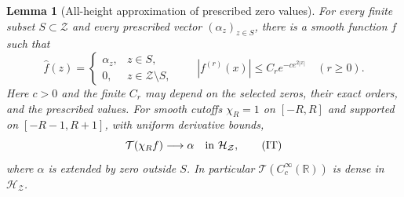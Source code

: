 \documentclass[11pt]{article}
\newtheorem{lemma}[theorem]{Lemma}
\theoremstyle{remark}\newtheorem{remark}[theorem]{Remark}
\newcommand{\R}{\mathbb R}
\begin{document}
\begin{lemma}[All-height approximation of prescribed zero values]
\label{lem:zero-interpolation}
For every finite subset $S\subset\mathcal Z$ and every prescribed
vector $(\alpha_z)_{z\in S}$, there is a smooth function $f$ such that
\[
 \widehat f(z)=\begin{cases}\alpha_z,&z\in S,\\0,&z\in\mathcal Z\setminus S,
                         \end{cases}
 \qquad |f^{(r)}(x)|\le C_r e^{-c e^{2|x|}}\quad(r\ge0). \tag{ID}
\]
Here $c>0$ and the finite $C_r$ may depend on the selected
zeros, their exact orders, and the prescribed values.
For smooth cutoffs $\chi_R=1$ on $[-R,R]$ and supported on
$[-R-1,R+1]$, with uniform derivative bounds,
\[
 \mathcal T(\chi_R f)\longrightarrow\alpha
                       \quad\hbox{in }\mathcal H_{\mathcal Z}, \tag{IT}
\]
where $\alpha$ is extended by zero outside $S$.
In particular $\mathcal T(C_c^\infty(\R))$ is dense in
$\mathcal H_{\mathcal Z}$.
\end{lemma}
\end{document}
